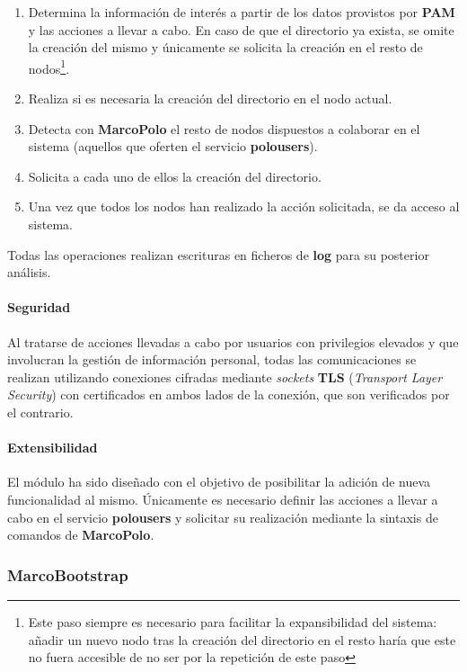 \begin{enumerate}
\item Determina la información de interés a partir de los datos provistos por \textbf{PAM} y las acciones a llevar a cabo. En caso de que el directorio ya exista, se omite la creación del mismo y únicamente se solicita la creación en el resto de nodos\footnote{Este paso siempre es necesario para facilitar la expansibilidad del sistema: añadir un nuevo nodo tras la creación del directorio en el resto haría que este no fuera accesible de no ser por la repetición de este paso}.
\item Realiza si es necesaria la creación del directorio en el nodo actual.
\item Detecta con \textbf{MarcoPolo} el resto de nodos dispuestos a colaborar en el sistema (aquellos que oferten el servicio \textbf{polousers}).
\item Solicita a cada uno de ellos la creación del directorio.
\item Una vez que todos los nodos han realizado la acción solicitada, se da acceso al sistema.
\end{enumerate}

Todas las operaciones realizan escrituras en ficheros de \textbf{log} para su posterior análisis.

\paragraph{Seguridad}

Al tratarse de acciones llevadas a cabo por usuarios con privilegios elevados y que involucran la gestión de información personal, todas las comunicaciones se realizan utilizando conexiones cifradas mediante \textit{sockets} \textbf{TLS} (\textit{Transport Layer Security}) con certificados en ambos lados de la conexión, que son verificados por el contrario.

\paragraph{Extensibilidad}

El módulo ha sido diseñado con el objetivo de posibilitar la adición de nueva funcionalidad al mismo. Únicamente es necesario definir las acciones a llevar a cabo en el servicio \textbf{polousers} y solicitar su realización mediante la sintaxis de comandos de \textbf{MarcoPolo}.

\subsubsection{MarcoBootstrap}

